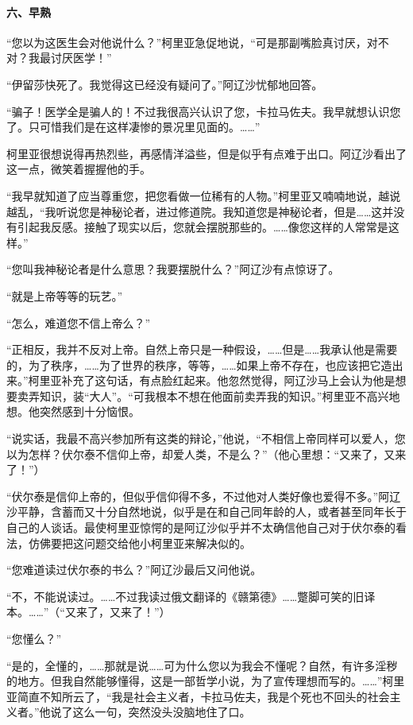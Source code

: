 \paragraph*{六、早熟}
\par “您以为这医生会对他说什么？”柯里亚急促地说，“可是那副嘴脸真讨厌，对不对？我最讨厌医学！”
\par “伊留莎快死了。我觉得这已经没有疑问了。”阿辽沙忧郁地回答。
\par “骗子！医学全是骗人的！不过我很高兴认识了您，卡拉马佐夫。我早就想认识您了。只可惜我们是在这样凄惨的景况里见面的。……”
\par 柯里亚很想说得再热烈些，再感情洋溢些，但是似乎有点难于出口。阿辽沙看出了这一点，微笑着握握他的手。
\par “我早就知道了应当尊重您，把您看做一位稀有的人物。”柯里亚又喃喃地说，越说越乱，“我听说您是神秘论者，进过修道院。我知道您是神秘论者，但是……这并没有引起我反感。接触了现实以后，您就会摆脱那些的。……像您这样的人常常是这样。”
\par “您叫我神秘论者是什么意思？我要摆脱什么？”阿辽沙有点惊讶了。
\par “就是上帝等等的玩艺。”
\par “怎么，难道您不信上帝么？”
\par “正相反，我并不反对上帝。自然上帝只是一种假设，……但是……我承认他是需要的，为了秩序，……为了世界的秩序，等等，……如果上帝不存在，也应该把它造出来。”柯里亚补充了这句话，有点脸红起来。他忽然觉得，阿辽沙马上会认为他是想要卖弄知识，装“大人”。“可我根本不想在他面前卖弄我的知识。”柯里亚不高兴地想。他突然感到十分恼恨。
\par “说实话，我最不高兴参加所有这类的辩论，”他说，“不相信上帝同样可以爱人，您以为怎样？伏尔泰不信仰上帝，却爱人类，不是么？”（他心里想：“又来了，又来了！”）
\par “伏尔泰是信仰上帝的，但似乎信仰得不多，不过他对人类好像也爱得不多。”阿辽沙平静，含蓄而又十分自然地说，似乎是在和自己同年龄的人，或者甚至同年长于自己的人谈话。最使柯里亚惊愕的是阿辽沙似乎并不太确信他自己对于伏尔泰的看法，仿佛要把这问题交给他小柯里亚来解决似的。
\par “您难道读过伏尔泰的书么？”阿辽沙最后又问他说。
\par “不，不能说读过。……不过我读过俄文翻译的《赣第德》……蹩脚可笑的旧译本。……”（“又来了，又来了！”）
\par “您懂么？”
\par “是的，全懂的，……那就是说……可为什么您以为我会不懂呢？自然，有许多淫秽的地方。但我自然能够懂得，这是一部哲学小说，为了宣传理想而写的。……”柯里亚简直不知所云了，“我是社会主义者，卡拉马佐夫，我是个死也不回头的社会主义者。”他说了这么一句，突然没头没脑地住了口。
